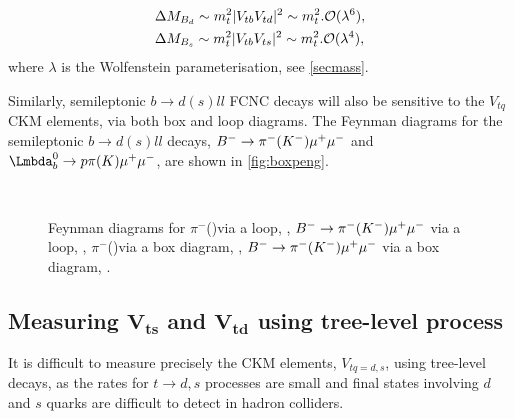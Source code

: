 \begin{equation}
  \begin{split}
    & \Delta M_{{B}_{d}} \sim m_{t}^{2}|{V_{{t}{b}}}{V_{{t}{d}}}|^{2} \sim m_{t}^{2}.\mathcal{O}(\lambda^{6}), \\
    & \Delta M_{{B}_{s}} \sim m_{t}^{2}|{V_{{t}{b}}}{V_{{t}{s}}}|^{2} \sim m_{t}^{2}.\mathcal{O}(\lambda^{4}),
  \end{split}
\end{equation}
where $\lambda$ is the Wolfenstein parameterisation, see \autoref{secmass}.

Similarly, semileptonic $b\to d(s)ll$ FCNC decays will also be sensitive to the $V_{tq}$ CKM elements, via both box and loop diagrams. The Feynman diagrams for the semileptonic $b\to d(s)ll$ decays, ${B}^{-}\rightarrow{\ensuremath{{\pi}^-}}({{K}^-}){\mu^+}{\mu^-}$ and $\Lb\to\proton\pi(\kaon)\mup\mun$, are shown in \autoref{fig:boxpeng}.   %
\begin{figure}[!h]\def\nh{0.5\textwidth}
  \centering
  \hspace*{-2cm}
  \\
  \hspace*{-2cm}
  \caption{Feynman diagrams for \Lb\to\proton$\pi^{-}$(\Km)\mup\mun via a loop, \protect{}, $B^{-}\rightarrow{\ensuremath{{\pi}^-}}({K}^{-}){\mu^+}{\mu^-}$ via a loop,  \protect{}, \Lb\to\proton$\pi^{-}$(\Km)\mup\mun via a box diagram,
   \protect{}, $B^{-}\rightarrow{\ensuremath{{\pi}^-}}({K}^{-}){\mu^+}{\mu^-}$ via a box diagram, \protect{}.
  }
  \label{fig:boxpeng}
\end{figure}

\subsection[Measuring $V_{ts}$ and $V_{td}$ using tree-level process]{Measuring $\mathbold{V_{ts}}$ and $\mathbold{V_{td}}$ using tree-level process}
It is difficult to measure precisely the CKM elements, $V_{tq=d,s}$, using tree-level decays, as the rates for $t \to d, s$ processes are small and final states involving $d$ and $s$ quarks are difficult to detect in hadron colliders.

